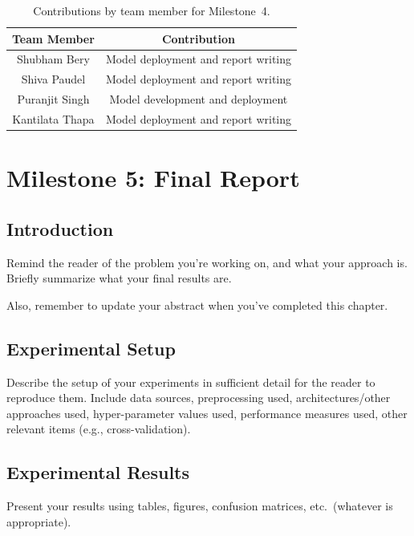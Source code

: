 \documentclass{report}
\begin{document}
\begin{table}[H]
    \caption{Contributions by team member for Milestone~4.}
    \centering
    \begin{tabular}{|c|c|} \hline
    {\bf Team Member}     &  {\bf Contribution}  \\ \hline
    Shubham Bery     &  Model deployment and report writing  \\
    Shiva Paudel   &  Model deployment and report writing \\
    Puranjit Singh &   Model development and deployment \\
    Kantilata Thapa & Model deployment and report writing \\ \hline
    
    \end{tabular}
    \label{tab:contribution4}
\end{table}

\iffalse
\chapter{Milestone 5: Final Report}


\section{Introduction}
\label{sec:M5-intro}

Remind the reader of the problem you're working on, and what your approach is.  Briefly summarize what your final results are.

Also, remember to update your abstract when you've completed this chapter.

\section{Experimental Setup}
\label{sec:M3-setup}

Describe the setup of your experiments  in sufficient detail for the reader to reproduce them.  Include data sources, preprocessing used, architectures/other approaches used, hyper-parameter values used, performance measures used, other relevant items (e.g., cross-validation).

\section{Experimental Results}
\label{sec:M5-results}

Present your results  using tables, figures, confusion matrices, etc.\ (whatever is appropriate). 
\end{document}
